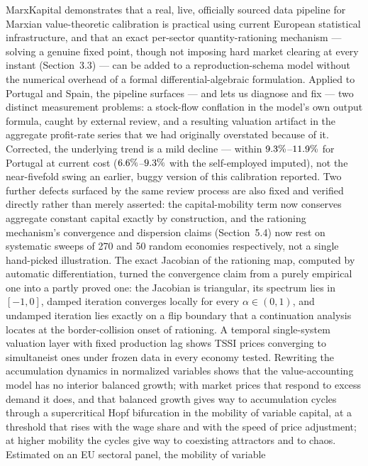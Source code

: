 \documentclass[11pt]{article}
\begin{document}
MarxKapital demonstrates that a real, live, officially sourced data
pipeline for Marxian value-theoretic calibration is practical using
current European statistical infrastructure, and that an exact per-sector
quantity-rationing mechanism --- solving a genuine fixed point, though
not imposing hard market clearing at every instant (Section~3.3) --- can
be added to a reproduction-schema model without the numerical overhead
of a formal differential-algebraic formulation. Applied to Portugal and
Spain, the pipeline surfaces --- and lets us diagnose and fix --- two
distinct measurement problems: a stock-flow conflation in the model's
own output formula, caught by external review, and a resulting
valuation artifact in the aggregate profit-rate series that we had
originally overstated because of it. Corrected, the underlying trend is
a mild decline --- within $9.3\%$--$11.9\%$ for
Portugal at current cost ($6.6\%$--$9.3\%$ with
the self-employed imputed), not the near-fivefold swing an earlier, buggy
version of this calibration reported. Two further defects surfaced by
the same review process are also fixed and verified directly rather than
merely asserted: the capital-mobility term now conserves aggregate
constant capital exactly by construction, and the rationing mechanism's
convergence and dispersion claims (Section~5.4) now rest on systematic
sweeps of 270 and 50 random economies respectively, not a single
hand-picked illustration. The exact Jacobian of the rationing map,
computed by automatic differentiation, turned the convergence claim
from a purely empirical one into a partly proved one: the Jacobian is
triangular, its spectrum lies in $[-1,0]$, damped iteration converges
locally for every $\alpha\in(0,1)$, and undamped iteration lies exactly
on a flip boundary that a continuation analysis locates at the
border-collision onset of rationing. A temporal single-system
valuation layer with fixed production lag shows TSSI prices converging
to simultaneist ones under frozen data in every economy tested. Rewriting
the accumulation dynamics in normalized variables shows that the
value-accounting model has no interior balanced growth; with market
prices that respond to excess demand it does, and that balanced growth
gives way to accumulation cycles through a supercritical Hopf
bifurcation in the mobility of variable capital, at a threshold that
rises with the wage share and with the speed of price adjustment; at
higher mobility the cycles give way to coexisting attractors and to
chaos. Estimated on an EU sectoral panel, the mobility of variable
\end{document}
